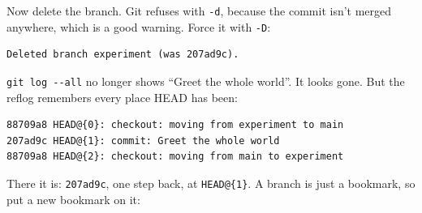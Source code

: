 
Now delete the branch. Git refuses with \texttt{-d}, because the commit isn't merged anywhere, which is a good warning. Force it with \texttt{-D}:

\begin{codeblock}

\begin{Shaded}
\begin{Highlighting}[]
\end{Highlighting}
\end{Shaded}

\end{codeblock}

\begin{codeblock}
\begin{Verbatim}[formatcom=\outputstyle]
Deleted branch experiment (was 207ad9c).
\end{Verbatim}
\end{codeblock}


\texttt{git\ log\ -\/-all} no longer shows ``Greet the whole world''. It looks gone. But the reflog remembers every place HEAD has been:

\begin{codeblock}

\begin{Shaded}
\begin{Highlighting}[]
\end{Highlighting}
\end{Shaded}

\end{codeblock}

\begin{codeblock}
\begin{Verbatim}[formatcom=\outputstyle]
88709a8 HEAD@{0}: checkout: moving from experiment to main
207ad9c HEAD@{1}: commit: Greet the whole world
88709a8 HEAD@{2}: checkout: moving from main to experiment
\end{Verbatim}
\end{codeblock}


There it is: \texttt{207ad9c}, one step back, at \texttt{HEAD@\{1\}}. A branch is just a bookmark, so put a new bookmark on it:

